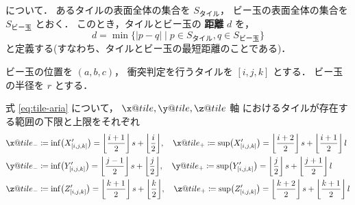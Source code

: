 {%
\subsubsection{}
\label{sec:collision-flow-4}

\begin{dfn}
  について．
  あるタイルの表面全体の集合を \(S_{\text{タイル}}\)， 
  ビー玉の表面全体の集合を \(S_{\text{ビー玉}}\) とおく．
  このとき，タイルとビー玉の {\bf 距離} \(d\)
  を，
  \[d = \min\{ |p - q| \mid p \in S_{\text{タイル}}, q \in S_{\text{ビー玉}} \}\]
  と定義する(すなわち、タイルとビー玉の最短距離のことである)．
\end{dfn}


ビー玉の位置を
\((a, b, c)\)，
衝突判定を行うタイルを \([i, j, k]\)
とする．
ビー玉の半径を \(r\) とする．

式 \eqref{eq:tile-aria}
について，
\(\x@tile, \y@tile, \z@tile\) 軸
におけるタイルが存在する範囲の下限と上限をそれぞれ
\begin{align*}
  &\x@tile_- \coloneqq \inf \bigl( X^\prime_{[i, j, k]} \bigr)
  = \biggl\lfloor \frac{i + 1}{2} \biggr\rfloor \, s + \biggl\lfloor \frac{i}{2} \biggr\rfloor , \quad
  \x@tile_+\coloneqq \sup \bigl( X^\prime_{[i, j, k]} \bigr)
  = \biggl\lfloor \frac{i + 2}{2} \biggr\rfloor \, s + \biggl\lfloor \frac{i + 1}{2} \biggr\rfloor \, l \\
  &\y@tile_- \coloneqq \inf \bigl( Y^\prime_{[i, j, k]} \bigr)
  = \biggl\lfloor \frac{j - 1}{2} \biggr\rfloor \, s + \biggl\lfloor \frac{j}{2} \biggr\rfloor , \quad
  \y@tile_+\coloneqq \sup \bigl( Y^\prime_{[i, j, k]} \bigr)
  = \biggl\lfloor \frac{j}{2} \biggr\rfloor \, s + \biggl\lfloor \frac{j + 1}{2} \biggr\rfloor \, l \\
  &\z@tile_- \coloneqq \inf \bigl( Z^\prime_{[i, j, k]} \bigr)
  = \biggl\lfloor \frac{k + 1}{2} \biggr\rfloor \, s + \biggl\lfloor \frac{k}{2} \biggr\rfloor , \quad
  \z@tile_+\coloneqq \sup \bigl( Z^\prime_{[i, j, k]} \bigr)
  = \biggl\lfloor \frac{k + 2}{2} \biggr\rfloor \, s + \biggl\lfloor \frac{k + 1}{2} \biggr\rfloor \, l
\end{align*}

}
